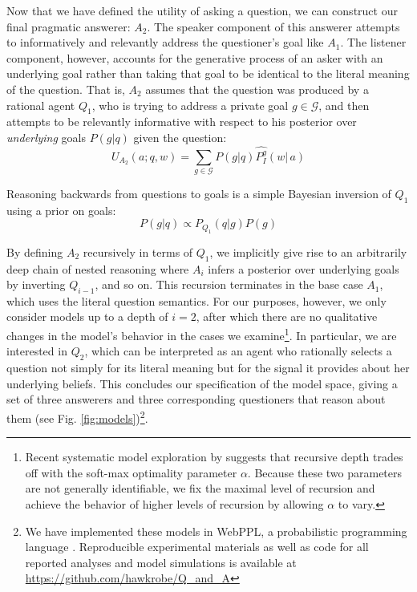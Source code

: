 \documentclass[12pt, floatsintext, jou]{apa6}
\begin{document}
Now that we have defined the utility of asking a question, we can construct our final pragmatic answerer: $A_2$. The speaker component of this answerer attempts to informatively and relevantly address the questioner's goal like $A_1$. The listener component, however, accounts for the generative process of an asker with an underlying goal rather than taking that goal to be identical to the literal meaning of the question. That is, $A_2$ assumes that the question was produced by a rational agent $Q_1$, who is trying to address a private goal $g \in \mathcal{G}$, and then attempts to be relevantly informative with respect to his posterior over \emph{underlying} goals $P(g|q)$ given the question:
\begin{equation}
U_{A_2}(a; q, w) = \sum_{g \in \mathcal{G}} P(g|q) \widehat{P^g_I}(w|\,a)
\end{equation}

%
Reasoning backwards from questions to goals is a simple Bayesian inversion of $Q_1$ using a prior on goals:
$$
P(g|q) \propto P_{Q_1}(q|g)P(g)
$$

By defining $A_2$ recursively in terms of $Q_1$, we implicitly give rise to an arbitrarily deep chain of nested reasoning where $A_{i}$ infers a posterior over underlying goals by inverting $Q_{i-1}$, and so on. This recursion terminates in the base case $A_1$, which uses the literal question semantics. For our purposes, however, we only consider models up to a depth of $i=2$, after which there are no qualitative changes in the model's behavior in the cases we examine\footnote{Recent systematic model exploration by  suggests that recursive depth trades off with the soft-max optimality parameter $\alpha$. Because these two parameters are not generally identifiable, we fix the maximal level of recursion and achieve the behavior of higher levels of recursion by allowing $\alpha$ to vary.}. In particular, we are interested in $Q_2$, which can be interpreted as an agent who rationally selects a question not simply for its literal meaning but for the signal it provides about her underlying beliefs. This concludes our specification of the model space, giving a set of three answerers and three corresponding questioners that reason about them (see Fig. \ref{fig:models})\footnote{We have implemented these models in WebPPL, a probabilistic programming language \cite{GoodmanStuhlmuller14_DIPPL}. Reproducible experimental materials as well as code for all reported analyses and model simulations is available at \url{https://github.com/hawkrobe/Q\_and\_A}}.
 
\end{document}

